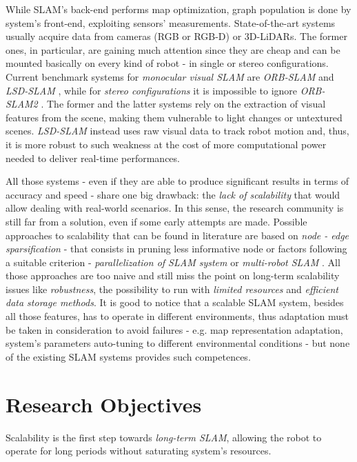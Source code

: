 \documentclass[10pt,a4paper, notitlepage]{report}
\begin{document}
While SLAM's back-end performs map optimization, graph population is done by system's front-end, exploiting sensors' measurements. State-of-the-art systems usually acquire data from cameras (RGB or RGB-D) or 3D-LiDARs. The former ones, in particular, are gaining much attention since they are cheap and can be mounted basically on every kind of robot - in single or stereo configurations. Current benchmark systems for \textit{monocular visual SLAM} are \textit{ORB-SLAM} \cite{mur2015orb-slam} and \textit{LSD-SLAM} \cite{engel2014lsd-slam}, while for \textit{stereo configurations} it is impossible to ignore \textit{ORB-SLAM2} \cite{mur2017orb-slam2}. The former and the latter systems rely on the extraction of visual features from the scene, making them vulnerable to light changes or untextured scenes. \textit{LSD-SLAM} instead uses raw visual data to track robot motion and, thus, it is more robust to such weakness at the cost of more computational power needed to deliver real-time performances.

All those systems - even if they are able to produce significant results in terms of accuracy and speed - share one big drawback: the \textit{lack of scalability} that would allow dealing with real-world scenarios. In this sense, the research community is still far from a solution, even if some early attempts are made. Possible approaches to scalability that can be found in literature are based on \textit{node - edge sparsification} \cite{kretzschmar2011graph-pruninig} \cite{huang2013consistent} - that consists in pruning less informative node or factors following a suitable criterion - \textit{parallelization of SLAM system} \cite{ni-dallaert2010nested-dissections} \cite{ni-dallaert2007tectonicSAM} \cite{grisetti2010hogman} or \textit{multi-robot SLAM} \cite{cunningham2013ddfSAM2} \cite{lazaro2013mr-slam}. All those approaches are too naive and still miss the point on long-term scalability issues like \textit{robustness}, the possibility to run with \textit{limited resources} and \textit{efficient data storage methods}. It is good to notice that a scalable SLAM system, besides all those features, has to operate in different environments, thus adaptation must be taken in consideration to avoid failures - e.g. map representation adaptation, system's parameters auto-tuning to different environmental conditions - but none of the existing SLAM systems provides such competences.

\section*{Research Objectives}
Scalability is the first step towards \textit{long-term SLAM}, allowing the robot to operate for long periods without saturating system's resources. 
\end{document}

